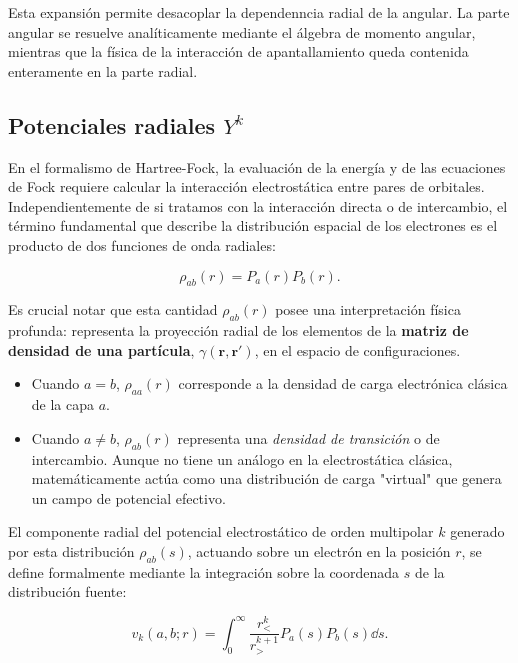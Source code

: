 \documentclass[12pt, a4paper, oneside, spanish]{book}
\begin{document}
Esta expansión permite desacoplar la dependenncia radial de la angular. La parte angular se resuelve analíticamente mediante el álgebra de momento angular, mientras que la física de la interacción de apantallamiento queda contenida enteramente en la parte radial.

\subsection{Potenciales radiales $Y^k$}

En el formalismo de Hartree-Fock, la evaluación de la energía y de las ecuaciones de Fock requiere calcular la interacción electrostática entre pares de orbitales. Independientemente de si tratamos con la interacción directa o de intercambio, el término fundamental que describe la distribución espacial de los electrones es el producto de dos funciones de onda radiales:

\begin{equation}
\label{eq:pair-density}
    \rho_{ab}(r) = P_a(r) P_b(r).
\end{equation}

Es crucial notar que esta cantidad $\rho_{ab}(r)$ posee una interpretación física profunda: representa la proyección radial de los elementos de la \textbf{matriz de densidad de una partícula}, $\gamma(\mathbf{r}, \mathbf{r}')$, en el espacio de configuraciones.

\begin{itemize}
\item Cuando $a = b$, $\rho_{aa}(r)$ corresponde a la densidad de carga electrónica clásica de la capa $a$.
\item Cuando $a \neq b$, $\rho_{ab}(r)$ representa una \textit{densidad de transición} o de intercambio. Aunque no tiene un análogo en la electrostática clásica, matemáticamente actúa como una distribución de carga "virtual" que genera un campo de potencial efectivo.
\end{itemize}

El componente radial del potencial electrostático de orden multipolar $k$ generado por esta distribución $\rho_{ab}(s)$, actuando sobre un electrón en la posición $r$, se define formalmente mediante la integración sobre la coordenada $s$ de la distribución fuente:

\begin{equation}
 \label{eq:vk-integral}
 v_k(a,b;r) = \int_0^{\infty} \frac{r_<^k}{r_>^{k+1}} P_a(s)P_b(s)\dd{s}.
\end{equation}
\end{document}
